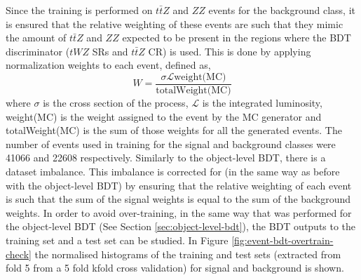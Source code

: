Since the training is performed on $t\bar{t}Z$ and $ZZ$ events for the background class, it is ensured that the relative weighting of these events are such that they mimic the amount of $t\bar{t}Z$ and $ZZ$ expected to be present in the regions where the BDT discriminator ($tWZ$ SRs and $t\bar{t}Z$ CR) is used. This is done by applying normalization weights to each event, defined as,
\begin{equation}
W = \frac{\sigma \mathcal{L} \text{weight(MC)}}{\text{totalWeight(MC)}}
\end{equation}
where $\sigma$ is the cross section of the process, $\mathcal{L}$ is the integrated luminosity, weight(MC) is the weight assigned to the event by the MC generator and totalWeight(MC) is the sum of those weights for all the generated events. The number of events used in training for the signal and background classes were 41066 and 22608 respectively. Similarly to the object-level BDT, there is a dataset imbalance. This imbalance is corrected for (in the same way as before with the object-level BDT) by ensuring that the relative weighting of each event is such that the sum of the signal weights is equal to the sum of the background weights. In order to avoid over-training, in the same way that was performed for the object-level BDT (See Section \ref{sec:object-level-bdt}), the BDT outputs to the training set and a test set can be studied. In Figure \ref{fig:event-bdt-overtrain-check} the normalised histograms of the training and test sets (extracted from fold 5 from a 5 fold kfold cross validation) for signal and background is shown.
